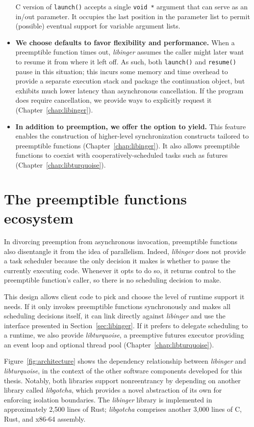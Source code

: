 \begin{itemize}
	C version of \texttt{launch()} accepts a single \texttt{void *} argument that
	can serve as an in/out parameter.  It occupies the last position in the
	parameter list to permit (possible) eventual support for variable argument
	lists.
\item \textbf{We choose defaults to favor flexibility and performance.}  When a
	preemptible function times out, \textit{libinger} assumes the caller might
	later want to resume it from where it left off.  As such, both
	\texttt{launch()} and \texttt{resume()} pause in this situation; this incurs
	some memory and time overhead to provide a separate execution stack and
	package the continuation object, but exhibits much lower latency than
	asynchronous cancellation.  If the program does require cancellation, we
	provide ways to explicitly request it (Chapter~\ref{chap:libinger}).
\item \textbf{In addition to preemption, we offer the option to yield.} This feature
	enables the construction of higher-level synchronization constructs tailored
	to preemptible functions (Chapter~\ref{chap:libinger}).  It also allows
	preemptible functions to coexist with cooperatively-scheduled tasks
	such as futures (Chapter~\ref{chap:libturquoise}).
\end{itemize}


\section{The preemptible functions ecosystem}

In divorcing preemption from asynchronous invocation, preemptible functions also
disentangle it from the idea of parallelism.  Indeed, \textit{libinger} does not
provide a task scheduler because the only decision it makes is whether to pause the
currently executing code.  Whenever it opts to do so, it returns control to the
preemptible function's caller, so there is no scheduling decision to make.

This design allows client code to pick and choose the level of runtime support it
needs.  If it only invokes preemptible functions synchronously and makes all
scheduling decisions itself, it can link directly against \textit{libinger} and use
the interface presented in Section~\ref{sec:libinger}.  If it prefers to delegate
scheduling to a runtime, we also provide \textit{libturquoise}, a preemptive futures
executor providing an event loop and optional thread pool
(Chapter~\ref{chap:libturquoise}).

Figure~\ref{fig:architecture} shows the dependency relationship between
\textit{libinger} and \textit{libturquoise}, in the context of the other software
components developed for this thesis.  Notably, both libraries support nonreentrancy
by depending on another library called \textit{libgotcha}, which provides a novel
abstraction of its own for enforcing isolation boundaries.  The \textit{libinger}
library is implemented in approximately 2,500 lines of Rust; \textit{libgotcha}
comprises another 3,000 lines of C, Rust, and x86-64 assembly.

